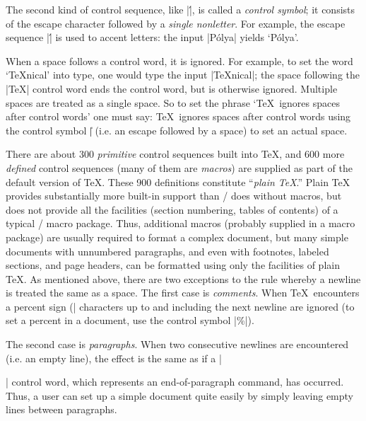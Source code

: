 The second kind of control sequence, like |\'|, is called a
{\sl control symbol}; it consists of the escape character
followed by a {\sl single nonletter}.  For example, the
escape sequence |\'| is used to accent letters: the input
|P\'olya| yields `P\'olya'.

When a space follows a control word, it is ignored.  For
example, to set the word `\TeX nical' into type, one would type
the input |\TeX  nical|; the space following the |\TeX| control
word ends
the control word, but is otherwise ignored. 
Multiple spaces are treated as a
single space.  So to set the phrase `\TeX\ ignores spaces
after control words' one must say:
\begintt
\TeX\ ignores spaces after control words
\endtt
using the control symbol |\|\] (i.e. an escape followed by a space)
to set an actual space.

There are about 300 {\sl primitive} control sequences built
into \TeX, and 600 more {\sl defined} control sequences (many
of them are {\sl macros}) are supplied as part of the default
version of \TeX.  These 900 definitions
constitute ``{\sl plain \TeX\/}.''  Plain \TeX{}
provides substantially more built-in support than \Troff/ does
without macros, but does not provide all the facilities
(section numbering, tables of contents) of a typical \Troff/ macro
package.  Thus, additional macros (probably supplied in
a macro package) are usually required to format
a complex document, but many simple documents with unnumbered
paragraphs, and even with footnotes, labeled sections,
and page headers,
can be formatted using only the facilities of plain \TeX.
As mentioned above, there are two exceptions to the rule
whereby a newline is treated the same as a space.  The
first case is {\sl comments\/}.  When \TeX\ encounters
a percent sign (|%
characters up to and including the next newline are ignored
(to set a percent in a document, use the control
symbol |\%|).

The second case is {\sl paragraphs\/}.  When two consecutive
newlines are encountered (i.e. an empty line), the effect is
the same as if a |\par| control word, which represents an
end-of-paragraph command, has occurred.  Thus, a user can set
up a simple document quite easily by simply leaving empty lines
between paragraphs.

